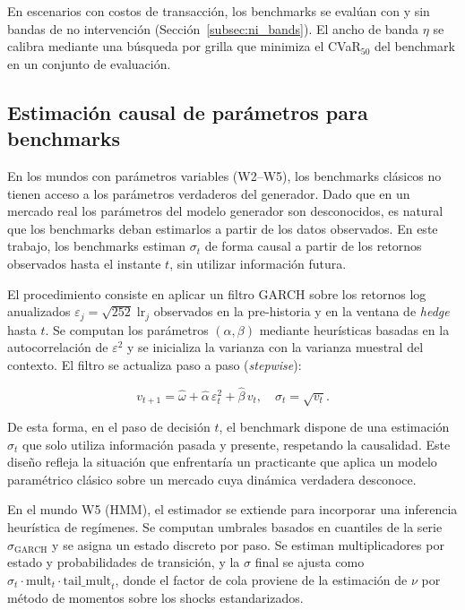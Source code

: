 \documentclass[11pt,a4paper,spanish]{article}
\numberwithin{equation}{section} %
\begin{document}
En escenarios con costos de transacción, los benchmarks se evalúan con y sin bandas de no intervención (Sección~\ref{subsec:ni_bands}). El ancho de banda $\eta$ se calibra mediante una búsqueda por grilla que minimiza el CVaR$_{50}$ del benchmark en un conjunto de evaluación.

\subsection{Estimación causal de parámetros para benchmarks}\label{subsec:causal_sigma}

En los mundos con parámetros variables (W2--W5), los benchmarks clásicos no tienen acceso a los parámetros verdaderos del generador. Dado que en un mercado real los parámetros del modelo generador son desconocidos, es natural que los benchmarks deban estimarlos a partir de los datos observados. En este trabajo, los benchmarks estiman $\sigma_t$ de forma causal a partir de los retornos observados hasta el instante $t$, sin utilizar información futura.

El procedimiento consiste en aplicar un filtro GARCH sobre los retornos log anualizados $\varepsilon_j = \sqrt{252}\;\text{lr}_j$ observados en la pre-historia y en la ventana de \textit{hedge} hasta $t$. Se computan los parámetros $(\alpha, \beta)$ mediante heurísticas basadas en la autocorrelación de $\varepsilon^2$ y se inicializa la varianza con la varianza muestral del contexto. El filtro se actualiza paso a paso (\textit{stepwise}):

\begin{equation}
v_{t+1} = \hat{\omega} + \hat{\alpha}\,\varepsilon_t^2 + \hat{\beta}\,v_t, \quad \sigma_t = \sqrt{v_t}.
\end{equation}

De esta forma, en el paso de decisión $t$, el benchmark dispone de una estimación $\sigma_t$ que solo utiliza información pasada y presente, respetando la causalidad. Este diseño refleja la situación que enfrentaría un practicante que aplica un modelo paramétrico clásico sobre un mercado cuya dinámica verdadera desconoce.

En el mundo W5 (HMM), el estimador se extiende para incorporar una inferencia heurística de regímenes. Se computan umbrales basados en cuantiles de la serie $\sigma_{\text{GARCH}}$ y se asigna un estado discreto por paso. Se estiman multiplicadores por estado y probabilidades de transición, y la $\sigma$ final se ajusta como $\sigma_t \cdot \text{mult}_t \cdot \text{tail\_mult}_t$, donde el factor de cola proviene de la estimación de $\nu$ por método de momentos sobre los shocks estandarizados.
\end{document}
